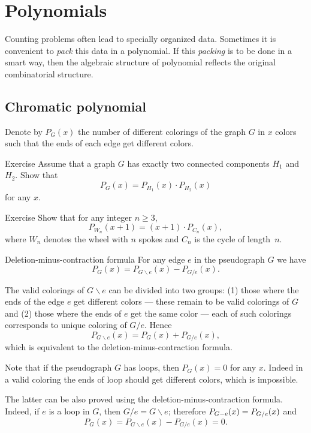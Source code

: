 \chapter{Polynomials}

Counting problems often lead to specially organized data.
Sometimes it is convenient to {}\emph{pack} this data in a polynomial.
If this {}\emph{packing} is to be done in a smart way, then the algebraic structure of polynomial reflects the original combinatorial structure.

\section*{Chromatic polynomial}

Denote by $P_G(x)$ the number of different colorings of the graph $G$ in $x$ colors such that the ends of each edge get different colors.

\begin{thm}{Exercise}
Assume that a graph $G$ has exactly two connected components $H_1$ and $H_2$.
Show that 
\[P_G(x)=P_{H_1}(x)\cdot P_{H_2}(x)\]
for any $x$.
\end{thm}

\begin{thm}{Exercise}
Show that for any integer $n\ge 3$,
\[P_{W_n}(x+1)=(x+1)\cdot P_{C_n}(x),\]
where $W_n$ denotes the wheel with $n$ spokes and $C_n$ is the cycle of length~$n$.
\end{thm}

\begin{thm}{Deletion-minus-contraction formula}\label{thm:deletion-minus-contraction}
For any edge $e$ in the pseudograph $G$ we have
\[P_G(x)=P_{G\backslash e}(x)-P_{G/e}(x).\]
\end{thm}

The valid colorings of $G\backslash e$ can be divided into two groups: 
(1) those where the ends of the edge $e$ get different colors --- these remain to be valid colorings of $G$ and (2) those where the ends of $e$ get the same color --- each of such colorings corresponds to unique coloring of $G/e$.
Hence
\[P_{G\backslash e}(x)=P_G(x)+P_{G/e}(x),\]
which is equivalent to the deletion-minus-contraction formula.
\qeds

Note that if the pseudograph $G$ has loops, then $P_G(x)=0$ for any $x$.
Indeed in a valid coloring the ends of loop should get different colors, which is impossible.

The latter can be also proved using the deletion-minus-contraction formula.
Indeed, if $e$ is a loop in $G$, then $G/e=G\backslash e$;
therefore $P_{G\backslash e}(x)\z=P_{G/e}(x)$ and
\[P_G(x)=P_{G\backslash e}(x)-P_{G/e}(x) =0.\]

